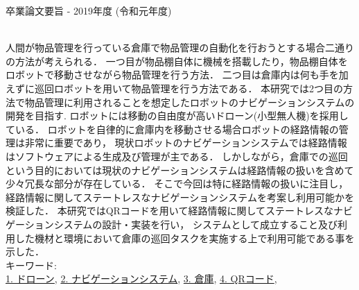 卒業論文要旨 - 2019年度 (令和元年度)
\begin{center}
\begin{large}
\end{large}
\end{center}
~ \\
人間が物品管理を行っている倉庫で物品管理の自動化を行おうとする場合二通りの方法が考えられる．
一つ目が物品棚自体に機械を搭載したり，物品棚自体をロボットで移動させながら物品管理を行う方法．
二つ目は倉庫内は何も手を加えずに巡回ロボットを用いて物品管理を行う方法である．
本研究では2つ目の方法で物品管理に利用されることを想定したロボットのナビゲーションシステムの開発を目指す.
ロボットには移動の自由度が高いドローン(小型無人機)を採用している．
ロボットを自律的に倉庫内を移動させる場合ロボットの経路情報の管理は非常に重要であり，
現状ロボットのナビゲーションシステムでは経路情報はソフトウェアによる生成及び管理が主である．
しかしながら，倉庫での巡回という目的においては現状のナビゲーションシステムは経路情報の扱いを含めて少々冗長な部分が存在している．
そこで今回は特に経路情報の扱いに注目し，経路情報に関してステートレスなナビゲーションシステムを考案し利用可能かを検証した．
本研究ではQRコードを用いて経路情報に関してステートレスなナビゲーションシステムの設計・実装を行い，
システムとして成立すること及び利用した機材と環境において倉庫の巡回タスクを実施する上で利用可能である事を示した．
~ \\
キーワード:\\
\underline{1. ドローン},
\underline{2. ナビゲーションシステム},
\underline{3. 倉庫},
\underline{4. QRコード},
\begin{flushright}
\dept \\
\author
\end{flushright}
